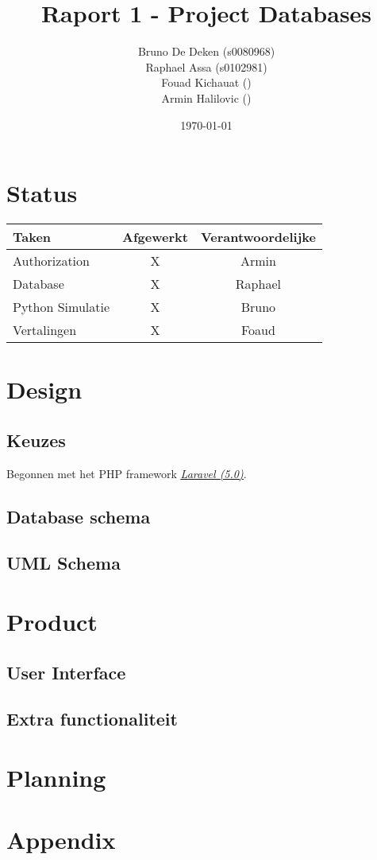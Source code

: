 \documentclass[12pt]{article}
\title{Raport 1 - Project Databases}
\author{
    Bruno De Deken (s0080968) \\
    Raphael Assa (s0102981) \\
    Fouad Kichauat () \\
    Armin Halilovic ()
}
\date{\today}
\begin{document}
\maketitle

\section{Status}
\begin{tabular}{| l | c | c |}
    \hline
    Taken   &   Afgewerkt   &   Verantwoordelijke \\
    \hline \hline
    Authorization           &   X   &   Armin \\
    Database                &   X   &   Raphael \\
    Python Simulatie        &   X   &   Bruno \\
    Vertalingen             &   X   &   Foaud \\
    \hline
\end{tabular}

\section{Design}
\subsection{Keuzes}
Begonnen met het PHP framework \href{http://laravel.com/}{\underline{\emph{Laravel (5.0)}}}.
\subsection{Database schema}
\subsection{UML Schema}

\section{Product}
\subsection{User Interface}
\subsection{Extra functionaliteit}

\section{Planning}
\section{Appendix}
\end{document}
